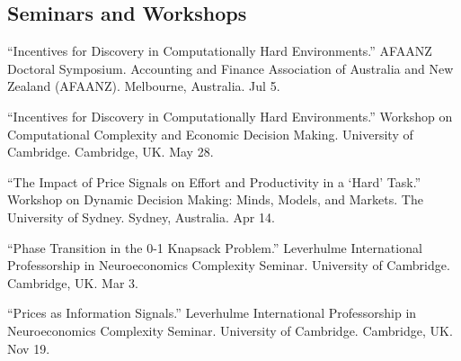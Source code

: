 \documentclass[11pt,letterpaper]{report}
\begin{document}
    \subsection*{Seminars and Workshops}
    \begin{tablist}
        \item[2026] \tab{}\enquote{Incentives for Discovery in Computationally Hard Environments.} AFAANZ Doctoral Symposium. Accounting and Finance Association of Australia and New Zealand (AFAANZ). Melbourne, Australia. Jul 5.
        \item[2026] \tab{}\enquote{Incentives for Discovery in Computationally Hard Environments.} Workshop on Computational Complexity and Economic Decision Making. University of Cambridge. Cambridge, UK. May 28.
        \item[2026] \tab{}\enquote{The Impact of Price Signals on Effort and Productivity in a `Hard' Task.} Workshop on Dynamic Decision Making: Minds, Models, and Markets. The University of Sydney. Sydney, Australia. Apr 14.
        \item[2025] \tab{}\enquote{Phase Transition in the 0-1 Knapsack Problem.} Leverhulme International Professorship in Neuroeconomics Complexity Seminar. University of Cambridge. Cambridge, UK. Mar 3.
        \item[2024] \tab{}\enquote{Prices as Information Signals.} Leverhulme International Professorship in Neuroeconomics Complexity Seminar. University of Cambridge. Cambridge, UK. Nov 19.
    \end{tablist}
\end{document}

